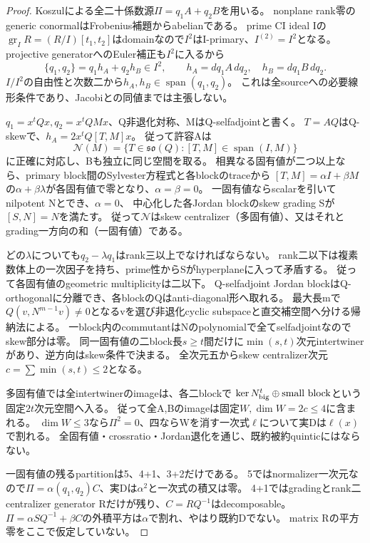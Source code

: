 \documentclass[a4paper,11pt]{ltjsarticle}
\theoremstyle{definition}
\begin{document}
\begin{proof}
Koszulによる全二十係数源$\Pi=q_1A+q_2B$を用いる。
nonplane rank零のgeneric conormalはFrobenius補題からabelianである。
prime CI ideal Iの$\operatorname{gr}_I R=(R/I)[t_1,t_2]$はdomainなので$I^2$はI-primary、$I^{(2)}=I^2$となる。
projective generatorへのEuler補正も$I^2$に入るから
\[
 \{q_1,q_2\}=q_1h_A+q_2h_B\in I^2,\qquad h_A=dq_1A\,dq_2,\quad h_B=dq_1B\,dq_2.
\]
$I/I^2$の自由性と次数二から$h_A,h_B\in\operatorname{span}(q_1,q_2)$。
これは全sourceへの必要線形条件であり、Jacobiとの同値までは主張しない。

$q_1=x^tQx,q_2=x^tQMx$、Q非退化対称、MはQ-selfadjointと書く。
$T=AQ$はQ-skewで、$h_A=2x^tQ[T,M]x$。
従って許容Aは
\[
 \mathcal N(M)=\{T\in\mathfrak{so}(Q):[T,M]\in\operatorname{span}(I,M)\}
\]
に正確に対応し、Bも独立に同じ空間を取る。
相異なる固有値が二つ以上なら、primary block間のSylvester方程式と各blockのtraceから
$[T,M]=\alpha I+\beta M$の$\alpha+\beta\lambda$が各固有値で零となり、$\alpha=\beta=0$。
一固有値ならscalarを引いてnilpotent Nとでき、$\alpha=0$、
中心化した各Jordan blockのskew grading Sが$[S,N]=N$を満たす。
従って$\mathcal N$はskew centralizer（多固有値）、又はそれとgrading一方向の和（一固有値）である。

どの$\lambda$についても$q_2-\lambda q_1$はrank三以上でなければならない。
rank二以下は複素数体上の一次因子を持ち、prime性からSがhyperplaneに入って矛盾する。
従って各固有値のgeometric multiplicityは二以下。
Q-selfadjoint Jordan blockはQ-orthogonalに分離でき、各blockのQはanti-diagonal形へ取れる。
最大長mで$Q(v,N^{m-1}v)\ne0$となるvを選び非退化cyclic subspaceと直交補空間へ分ける帰納法による。
一block内のcommutantはNのpolynomialで全てselfadjointなのでskew部分は零。
同一固有値の二block長$s\ge t$間だけに$\min(s,t)$次元intertwinerがあり、逆方向はskew条件で決まる。
全次元五からskew centralizer次元$c=\sum\min(s,t)\le2$となる。

多固有値では全intertwinerのimageは、各二blockで
$\ker N_{\rm big}^t\oplus\text{small block}$という固定$2t$次元空間へ入る。
従って全A,Bのimageは固定$W,\dim W=2c\le4$に含まれる。
$\dim W\le3$なら$\Pi^2=0$、四ならWを消す一次式$\ell$について実Dは$\ell(x)$で割れる。
全固有値・crossratio・Jordan退化を通じ、既約被約quinticにはならない。

一固有値の残るpartitionは5、4+1、3+2だけである。
5ではnormalizer一次元なので$\Pi=\alpha(q_1,q_2)C$、実Dは$\alpha^2$と一次式の積又は零。
4+1ではgradingとrank二centralizer generator Rだけが残り、$C=RQ^{-1}$はdecomposable。
$\Pi=\alpha SQ^{-1}+\beta C$の外積平方は$\alpha$で割れ、やはり既約Dでない。
matrix Rの平方零をここで仮定していない。


\end{proof}
\end{document}
